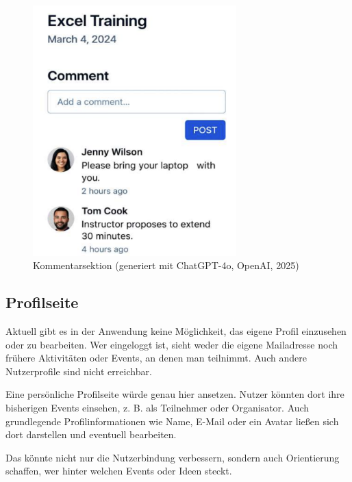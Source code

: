 \documentclass[a4paper,12pt]{article}
\begin{document}
\begin{figure}[H]
    \centering
    \includegraphics[width=0.7\textwidth]{Abbildungen/kommentarsektion.png}
    \caption{Kommentarsektion (generiert mit ChatGPT-4o, OpenAI, 2025)}
    \label{fig:kommentarsektion}
\end{figure}

\newpage


\subsection{Profilseite}

Aktuell gibt es in der Anwendung keine Möglichkeit, das eigene Profil einzusehen oder zu bearbeiten. Wer eingeloggt ist, sieht weder die eigene Mailadresse noch frühere Aktivitäten oder Events, an denen man teilnimmt. Auch andere Nutzerprofile sind nicht erreichbar.

Eine persönliche Profilseite würde genau hier ansetzen. Nutzer könnten dort ihre bisherigen Events einsehen, z. B. als Teilnehmer oder Organisator. Auch grundlegende Profilinformationen wie Name, E-Mail oder ein Avatar ließen sich dort darstellen und eventuell bearbeiten.

Das könnte nicht nur die Nutzerbindung verbessern, sondern auch Orientierung schaffen, wer hinter welchen Events oder Ideen steckt.
\end{document}
